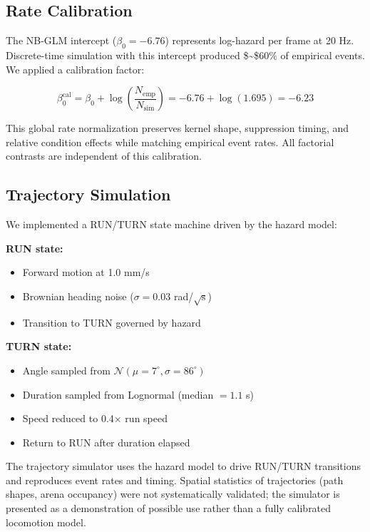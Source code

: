 \documentclass[
  11pt,
  letterpaper,
]{article}
\begin{document}
\subsection{Rate Calibration}

The NB-GLM intercept (\(\beta_0 = -6.76\)) represents log-hazard per
frame at 20 Hz. Discrete-time simulation with this intercept produced
\$\sim\$60\% of empirical events. We applied a calibration factor:

\begin{equation}
\beta_0^{\text{cal}} = \beta_0 + \log\left(\frac{N_{\text{emp}}}{N_{\text{sim}}}\right) = -6.76 + \log(1.695) = -6.23
\end{equation}

This global rate normalization preserves kernel shape, suppression
timing, and relative condition effects while matching empirical event
rates. All factorial contrasts are independent of this calibration.

\subsection{Trajectory Simulation}

We implemented a RUN/TURN state machine driven by the hazard model:

\textbf{RUN state:}

\begin{itemize}
    \item Forward motion at 1.0 mm/s
    \item Brownian heading noise ($\sigma = 0.03$ rad/$\sqrt{\text{s}}$)
    \item Transition to TURN governed by hazard
\end{itemize}

\textbf{TURN state:}

\begin{itemize}
    \item Angle sampled from $\mathcal{N}(\mu = 7^\circ, \sigma = 86^\circ)$
    \item Duration sampled from Lognormal (median $= 1.1$ s)
    \item Speed reduced to 0.4$\times$ run speed
    \item Return to RUN after duration elapsed
\end{itemize}

The trajectory simulator uses the hazard model to drive RUN/TURN
transitions and reproduces event rates and timing. Spatial statistics of
trajectories (path shapes, arena occupancy) were not systematically
validated; the simulator is presented as a demonstration of possible use
rather than a fully calibrated locomotion model.
\end{document}
